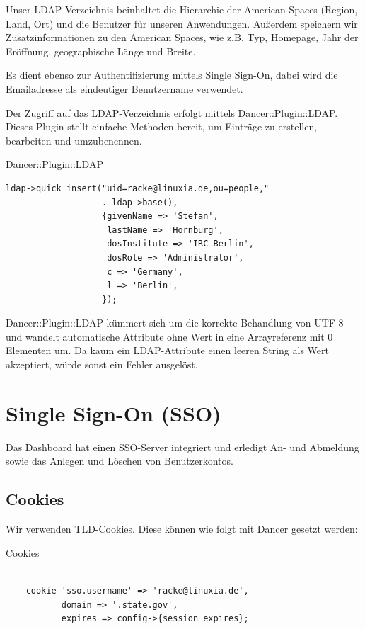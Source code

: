 Unser LDAP-Verzeichnis beinhaltet die Hierarchie der American Spaces
(Region, Land, Ort) und die Benutzer für unseren Anwendungen.
Außerdem speichern wir Zusatzinformationen zu den American Spaces,
wie z.B. Typ, Homepage, Jahr der Eröffnung, geographische Länge und Breite.
    
Es dient ebenso zur Authentifizierung mittels Single Sign-On, dabei
wird die Emailadresse als eindeutiger Benutzername verwendet.
    
Der Zugriff auf das LDAP-Verzeichnis erfolgt mittels
Dancer::Plugin::LDAP. Dieses Plugin stellt einfache
Methoden bereit, um Einträge zu erstellen, bearbeiten
und umzubenennen.

\begin{frame}[fragile]{Dancer::Plugin::LDAP}
\begin{lstlisting}
ldap->quick_insert("uid=racke@linuxia.de,ou=people," 
                   . ldap->base(),
                   {givenName => 'Stefan',
                    lastName => 'Hornburg',
                    dosInstitute => 'IRC Berlin',
                    dosRole => 'Administrator',
                    c => 'Germany',
                    l => 'Berlin',
                   });
\end{lstlisting}
\end{frame}

Dancer::Plugin::LDAP kümmert sich um die korrekte Behandlung
von UTF-8 und wandelt automatische Attribute ohne Wert in eine
Arrayreferenz mit 0 Elementen um. Da kaum ein LDAP-Attribute einen
leeren String als Wert akzeptiert, würde sonst ein Fehler
ausgelöst.

\section{Single Sign-On (SSO)}

Das Dashboard hat einen SSO-Server integriert und erledigt An- und
Abmeldung sowie das Anlegen und Löschen von Benutzerkontos.

\subsection{Cookies}

Wir verwenden TLD-Cookies. Diese können wie folgt mit Dancer
gesetzt werden:

\begin{frame}[fragile]{Cookies}
\begin{lstlisting}

    cookie 'sso.username' => 'racke@linuxia.de',
           domain => '.state.gov',
           expires => config->{session_expires};

\end{lstlisting}
\end{frame}


